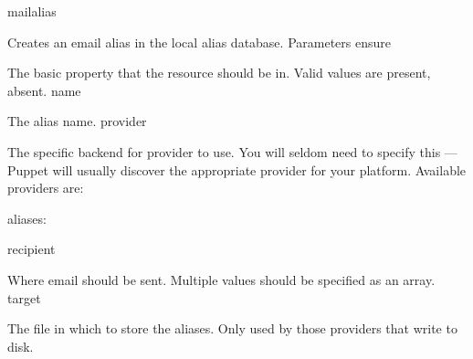 mailalias

Creates an email alias in the local alias database.
Parameters
ensure

The basic property that the resource should be in. Valid values are present, absent.
name

The alias name.
provider

The specific backend for provider to use. You will seldom need to specify this — Puppet will usually discover the appropriate provider for your platform. Available providers are:

    aliases:

recipient

Where email should be sent. Multiple values should be specified as an array.
target

The file in which to store the aliases. Only used by those providers that write to disk.
